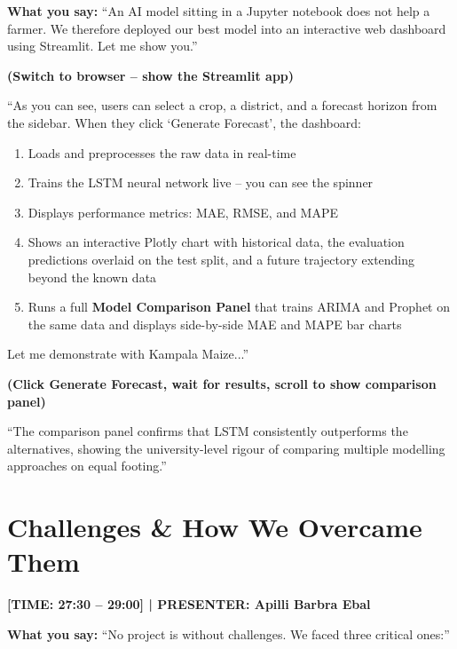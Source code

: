 \documentclass[11pt,a4paper]{article}
\begin{document}
\textbf{What you say:}
``An AI model sitting in a Jupyter notebook does not help a farmer. We therefore deployed our best model into an interactive web dashboard using Streamlit. Let me show you.''

\textbf{(Switch to browser -- show the Streamlit app)}

``As you can see, users can select a crop, a district, and a forecast horizon from the sidebar. When they click `Generate Forecast', the dashboard:
\begin{enumerate}
    \item Loads and preprocesses the raw data in real-time
    \item Trains the LSTM neural network live -- you can see the spinner
    \item Displays performance metrics: MAE, RMSE, and MAPE
    \item Shows an interactive Plotly chart with historical data, the evaluation predictions overlaid on the test split, and a future trajectory extending beyond the known data
    \item Runs a full \textbf{Model Comparison Panel} that trains ARIMA and Prophet on the same data and displays side-by-side MAE and MAPE bar charts
\end{enumerate}
Let me demonstrate with Kampala Maize...''

\textbf{(Click Generate Forecast, wait for results, scroll to show comparison panel)}

``The comparison panel confirms that LSTM consistently outperforms the alternatives, showing the university-level rigour of comparing multiple modelling approaches on equal footing.''

\section{Challenges \& How We Overcame Them}
\textcolor{timecolor}{\textbf{[TIME: 27:30 -- 29:00] | PRESENTER: Apilli Barbra Ebal}}

\textbf{What you say:}
``No project is without challenges. We faced three critical ones:''
\end{document}
